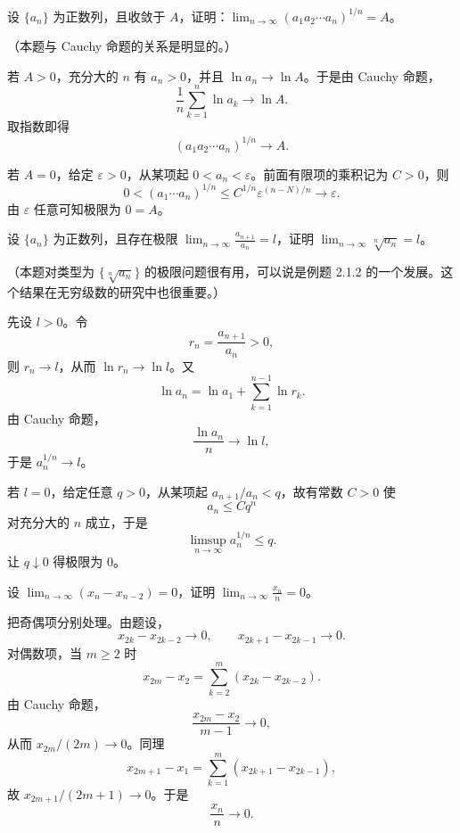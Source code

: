 \begin{xexercise}[5]
设 $\{a_n\}$ 为正数列，且收敛于 $A$，证明：$\displaystyle\lim_{n\to\infty}(a_1a_2\cdots a_n)^{1/n}=A$。

  （本题与 Cauchy 命题的关系是明显的。）
\end{xexercise}
\begin{xsolution}
若 $A>0$，充分大的 $n$ 有 $a_n>0$，并且 $\ln a_n\to\ln A$。于是由 Cauchy 命题，
\[
  \frac1n\sum_{k=1}^n\ln a_k\to\ln A.
\]
取指数即得
\[
  (a_1a_2\cdots a_n)^{1/n}\to A.
\]

若 $A=0$，给定 $\varepsilon>0$，从某项起 $0<a_n<\varepsilon$。前面有限项的乘积记为 $C>0$，则
\[
  0<(a_1\cdots a_n)^{1/n}
  \le C^{1/n}\varepsilon^{(n-N)/n}\to\varepsilon.
\]
由 $\varepsilon$ 任意可知极限为 $0=A$。
\end{xsolution}


\begin{xexercise}[6]
设 $\{a_n\}$ 为正数列，且存在极限 $\displaystyle\lim_{n\to\infty}\frac{a_{n+1}}{a_n}=l$，证明 $\displaystyle\lim_{n\to\infty}\sqrt[n]{a_n}=l$。

  （本题对类型为 $\{\sqrt[n]{a_n}\}$ 的极限问题很有用，可以说是例题 2.1.2 的一个发展。这个结果在无穷级数的研究中也很重要。）
\end{xexercise}
\begin{xsolution}
先设 $l>0$。令
\[
  r_n=\frac{a_{n+1}}{a_n}>0,
\]
则 $r_n\to l$，从而 $\ln r_n\to\ln l$。又
\[
  \ln a_n=\ln a_1+\sum_{k=1}^{n-1}\ln r_k.
\]
由 Cauchy 命题，
\[
  \frac{\ln a_n}{n}\to\ln l,
\]
于是 $a_n^{1/n}\to l$。

若 $l=0$，给定任意 $q>0$，从某项起 $a_{n+1}/a_n<q$，故有常数 $C>0$ 使
\[
  a_n\le Cq^n
\]
对充分大的 $n$ 成立，于是
\[
  \limsup_{n\to\infty}a_n^{1/n}\le q.
\]
让 $q\downarrow0$ 得极限为 $0$。
\end{xsolution}


\begin{xexercise}[7]
设 $\displaystyle\lim_{n\to\infty}(x_n-x_{n-2})=0$，证明 $\displaystyle\lim_{n\to\infty}\frac{x_n}{n}=0$。
\end{xexercise}
\begin{xsolution}
把奇偶项分别处理。由题设，
\[
  x_{2k}-x_{2k-2}\to0,
  \qquad
  x_{2k+1}-x_{2k-1}\to0.
\]
对偶数项，当 $m\ge2$ 时
\[
  x_{2m}-x_2=\sum_{k=2}^m(x_{2k}-x_{2k-2}).
\]
由 Cauchy 命题，
\[
  \frac{x_{2m}-x_2}{m-1}\to0,
\]
从而 $x_{2m}/(2m)\to0$。同理
\[
  x_{2m+1}-x_1=\sum_{k=1}^m(x_{2k+1}-x_{2k-1}),
\]
故 $x_{2m+1}/(2m+1)\to0$。于是
\[
  \boxed{\frac{x_n}{n}\to0}.
\]
\end{xsolution}


